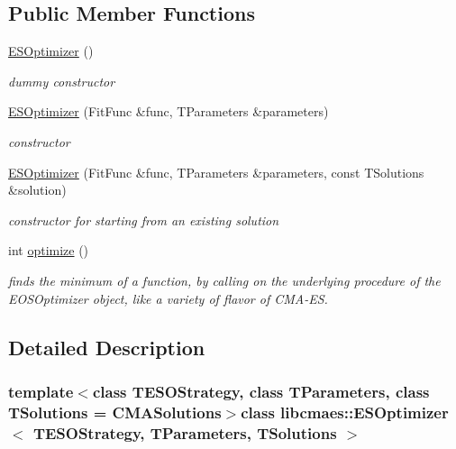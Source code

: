 \subsection*{Public Member Functions}
\begin{DoxyCompactItemize}
\item 
\hypertarget{classlibcmaes_1_1ESOptimizer_a6a2cdd5a168a2ffb8ce0689d16c364e6}{\hyperlink{classlibcmaes_1_1ESOptimizer_a6a2cdd5a168a2ffb8ce0689d16c364e6}{E\+S\+Optimizer} ()}\label{classlibcmaes_1_1ESOptimizer_a6a2cdd5a168a2ffb8ce0689d16c364e6}

\begin{DoxyCompactList}\small\item\em dummy constructor \end{DoxyCompactList}\item 
\hyperlink{classlibcmaes_1_1ESOptimizer_a72c6ef297e29b6f85a410dbbdc0fa93e}{E\+S\+Optimizer} (Fit\+Func \&func, T\+Parameters \&parameters)
\begin{DoxyCompactList}\small\item\em constructor \end{DoxyCompactList}\item 
\hyperlink{classlibcmaes_1_1ESOptimizer_aab16f590ab683f4c4dd6f618c5e831a9}{E\+S\+Optimizer} (Fit\+Func \&func, T\+Parameters \&parameters, const T\+Solutions \&solution)
\begin{DoxyCompactList}\small\item\em constructor for starting from an existing solution \end{DoxyCompactList}\item 
\hypertarget{classlibcmaes_1_1ESOptimizer_ad14d01c88f05a536d18be2277766a715}{int \hyperlink{classlibcmaes_1_1ESOptimizer_ad14d01c88f05a536d18be2277766a715}{optimize} ()}\label{classlibcmaes_1_1ESOptimizer_ad14d01c88f05a536d18be2277766a715}

\begin{DoxyCompactList}\small\item\em finds the minimum of a function, by calling on the underlying procedure of the E\+O\+S\+Optimizer object, like a variety of flavor of C\+M\+A-\/\+E\+S. \end{DoxyCompactList}\end{DoxyCompactItemize}


\subsection{Detailed Description}
\subsubsection*{template$<$class T\+E\+S\+O\+Strategy, class T\+Parameters, class T\+Solutions = C\+M\+A\+Solutions$>$class libcmaes\+::\+E\+S\+Optimizer$<$ T\+E\+S\+O\+Strategy, T\+Parameters, T\+Solutions $>$}

